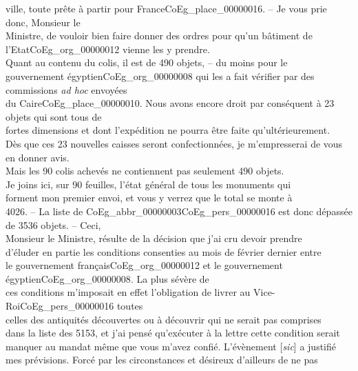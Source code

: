 \documentclass{book}
\begin{document}
\noindent ville, toute prête à partir pour France\gls{CoEg_place_00000016}. – Je vous prie donc, Monsieur le\\
Ministre, de vouloir bien faire donner des ordres pour qu’un bâtiment de\\
l’Etat\gls{CoEg_org_00000012} vienne les y prendre.\\
\indent Quant au contenu du colis, il est de 490 objets, – du moins pour le\\
gouvernement égyptien\gls{CoEg_org_00000008} qui les a fait vérifier par des commissions \textit{ad hoc} envoyées\\
du Caire\gls{CoEg_place_00000010}. Nous avons encore droit par conséquent à 23 objets qui sont tous de\\
fortes dimensions et dont l’expédition ne pourra être faite qu’ultérieurement.\\
Dès que ces 23 nouvelles caisses seront confectionnées, je m’empresserai de vous\\
en donner avis.\\
\indent Mais les 90 colis achevés ne contiennent pas seulement 490 objets.\\
Je joins ici, sur 90 feuilles, l’état général de tous les monuments qui\\
forment mon premier envoi, et vous y verrez que le total se monte à\\
4026. – La liste de \gls{CoEg_abbr_00000003}\gls{CoEg_pers_00000016} est donc dépassée de 3536 objets. – Ceci,\\
Monsieur le Ministre, résulte de la décision que j’ai cru devoir prendre\\
d’éluder en partie les conditions consenties au mois de février dernier entre\\
le gouvernement français\gls{CoEg_org_00000012} et le gouvernement égyptien\gls{CoEg_org_00000008}. La plus sévère de\\
ces conditions m’imposait en effet l’obligation de livrer au Vice-Roi\gls{CoEg_pers_00000016} toutes\\
celles des antiquités découvertes ou à découvrir qui ne serait pas comprises\\
dans la liste des 5153, et j’ai pensé qu’exécuter à la lettre cette condition serait\\
manquer au mandat même que vous m’avez confié. L’évènement {[\textit{sic}]} a justifié\\
mes prévisions. Forcé par les circonstances et désireux d’ailleurs de ne pas\\
\end{document}

